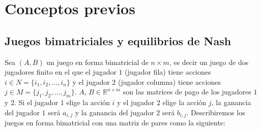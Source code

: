 \chapter{Conceptos previos}  \label{cap:previos}

\section{Juegos bimatriciales y equilibrios de Nash}



Sea $(A, B)$ un juego en forma bimatricial de $n \times m$, es decir un juego de dos jugadores finito en el que el jugador $1$ (jugador fila) tiene acciones $i \in N = \{i_1, i_2, \dots, i_n\}$ y el jugador $2$ (jugador columna) tiene acciones $j \in M = \{j_1, j_2, \dots, j_m\}$. $A$, $B \in \mathbb{R}^{n \times m}$ son las matrices de pago de los jugadores $1$ y $2$. Si el jugador $1$ elige la acción $i$ y el jugador $2$ elige la acción $j$, la ganancia del jugador $1$ será $a_{i,j}$ y la ganancia del jugador $2$ será $b_{i,j}$. Describiremos los juegos en forma bimatricial con una matriz de pares como la siguiente:


